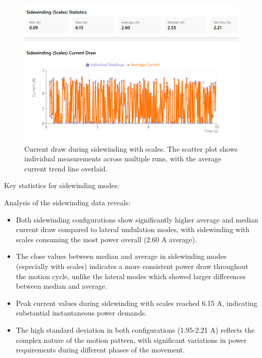 \documentclass[12pt,a4paper]{report}
\begin{document}
\begin{figure}[H]
    \centering
    \includegraphics[width=12cm]{media/sidewinding_scales_current.png}
    \caption{Current draw during sidewinding with scales. The scatter plot shows individual measurements across multiple runs, with the average current trend line overlaid.}
    \label{fig:sidewinding_scales_current}
\end{figure}

Key statistics for sidewinding modes:

\begin{table}[H]
    \centering
    \caption{Current consumption statistics across different sidewinding configurations.}
    \label{tab:sidewinding_current_measurements}
\end{table}

Analysis of the sidewinding data reveals:
\begin{itemize}
    \item Both sidewinding configurations show significantly higher average and median current draw compared to lateral undulation modes, with sidewinding with scales consuming the most power overall (2.60 A average).
    \item The close values between median and average in sidewinding modes (especially with scales) indicates a more consistent power draw throughout the motion cycle, unlike the lateral modes which showed larger differences between median and average.
    \item Peak current values during sidewinding with scales reached 6.15 A, indicating substantial instantaneous power demands.
    \item The high standard deviation in both configurations (1.95-2.21 A) reflects the complex nature of the motion pattern, with significant variations in power requirements during different phases of the movement.
\end{itemize}
\end{document}
